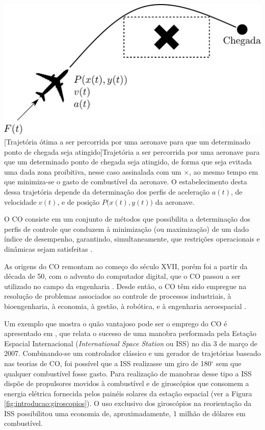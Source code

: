 \noindent	
\begin{minipage}{\textwidth}
	\vspace{\onelineskip}
	\centering
	\includegraphics[width=0.7\linewidth]{draw/introducao/pdf/aviaoControleOtimo}
	[Trajetória ótima a ser percorrida por uma aeronave para que um determinado ponto de chegada seja atingido]{Trajetória a ser percorrida por uma aeronave para que um determinado ponto de chegada seja atingido, de forma que seja evitada uma dada zona proibitiva, nesse caso assinalada com um $ \times $, ao mesmo tempo em que minimiza-se o gasto de combustível da aeronave. O estabelecimento desta dessa trajetória depende da determinação dos perfis de aceleração $ a(t) $, de velocidade $ v(t) $, e de posição $ P\big(x(t), y(t)\big) $ da aeronave.}
	\label{fig:introducao:aeronaveControleOtimo}
	\vspace{\onelineskip}
\end{minipage}

O CO consiste em um conjunto de métodos que possibilita a determinação dos perfis de controle que conduzem à minimização (ou maximização) de um dado índice de desempenho, garantindo, simultaneamente, que restrições operacionais e dinâmicas sejam satisfeitas \cite{kirk_optimal_2004, becerra_optimal_2008, kelly_introduction_2017}. 


As origens do CO remontam ao começo do século XVII, porém foi a partir da década de 50, com o advento do computador digital, que o CO passou a ser utilizado no campo da engenharia \cite{bryson_optimal_1996}. Desde então, o CO têm sido empregue na resolução de problemas associados ao controle de processos industriais, à bioengenharia, à economia, à gestão, à robótica, e à engenharia aeroespacial \cite{becerra_optimal_2008}.  

Um exemplo que mostra o quão vantajoso pode ser o emprego do CO é apresentado em , que relata o sucesso de uma manobra performada pela Estação Espacial Internacional (\textit{International Space Station} ou ISS) no dia 3 de março de 2007. Combinando-se um controlador clássico e um gerador de trajetórias baseado nas teorias de CO, foi possível que a ISS realizasse um giro de 180$^{\circ}$ sem que qualquer combustível fosse gasto. Para realização de manobras desse tipo a ISS dispõe de propulsores movidos à combustível e de giroscópios que consomem a energia elétrica fornecida pelos painéis solares da estação espacial (ver a Figura \ref{fig:introducao:giroscopios}). O uso exclusivo dos giroscópios na reorientação da ISS possibilitou uma economia de, aproximadamente, 1 milhão de dólares em combustível.

